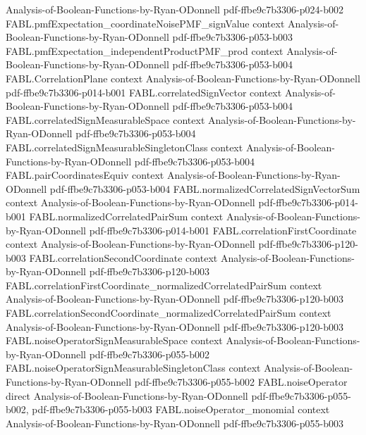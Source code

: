 \begin{theorem}
  {Analysis-of-Boolean-Functions-by-Ryan-ODonnell}
  {pdf-ffbe9c7b3306-p024-b002}
\proofstep
  {FABL.pmfExpectation_coordinateNoisePMF_signValue}
  {context}
  {Analysis-of-Boolean-Functions-by-Ryan-ODonnell}
  {pdf-ffbe9c7b3306-p053-b003}
\proofstep
  {FABL.pmfExpectation_independentProductPMF_prod}
  {context}
  {Analysis-of-Boolean-Functions-by-Ryan-ODonnell}
  {pdf-ffbe9c7b3306-p053-b004}
\proofstep
  {FABL.CorrelationPlane}
  {context}
  {Analysis-of-Boolean-Functions-by-Ryan-ODonnell}
  {pdf-ffbe9c7b3306-p014-b001}
\proofstep
  {FABL.correlatedSignVector}
  {context}
  {Analysis-of-Boolean-Functions-by-Ryan-ODonnell}
  {pdf-ffbe9c7b3306-p053-b004}
\proofstep
  {FABL.correlatedSignMeasurableSpace}
  {context}
  {Analysis-of-Boolean-Functions-by-Ryan-ODonnell}
  {pdf-ffbe9c7b3306-p053-b004}
\proofstep
  {FABL.correlatedSignMeasurableSingletonClass}
  {context}
  {Analysis-of-Boolean-Functions-by-Ryan-ODonnell}
  {pdf-ffbe9c7b3306-p053-b004}
\proofstep
  {FABL.pairCoordinatesEquiv}
  {context}
  {Analysis-of-Boolean-Functions-by-Ryan-ODonnell}
  {pdf-ffbe9c7b3306-p053-b004}
\proofstep
  {FABL.normalizedCorrelatedSignVectorSum}
  {context}
  {Analysis-of-Boolean-Functions-by-Ryan-ODonnell}
  {pdf-ffbe9c7b3306-p014-b001}
\proofstep
  {FABL.normalizedCorrelatedPairSum}
  {context}
  {Analysis-of-Boolean-Functions-by-Ryan-ODonnell}
  {pdf-ffbe9c7b3306-p014-b001}
\proofstep
  {FABL.correlationFirstCoordinate}
  {context}
  {Analysis-of-Boolean-Functions-by-Ryan-ODonnell}
  {pdf-ffbe9c7b3306-p120-b003}
\proofstep
  {FABL.correlationSecondCoordinate}
  {context}
  {Analysis-of-Boolean-Functions-by-Ryan-ODonnell}
  {pdf-ffbe9c7b3306-p120-b003}
\proofstep
  {FABL.correlationFirstCoordinate_normalizedCorrelatedPairSum}
  {context}
  {Analysis-of-Boolean-Functions-by-Ryan-ODonnell}
  {pdf-ffbe9c7b3306-p120-b003}
\proofstep
  {FABL.correlationSecondCoordinate_normalizedCorrelatedPairSum}
  {context}
  {Analysis-of-Boolean-Functions-by-Ryan-ODonnell}
  {pdf-ffbe9c7b3306-p120-b003}
\proofstep
  {FABL.noiseOperatorSignMeasurableSpace}
  {context}
  {Analysis-of-Boolean-Functions-by-Ryan-ODonnell}
  {pdf-ffbe9c7b3306-p055-b002}
\proofstep
  {FABL.noiseOperatorSignMeasurableSingletonClass}
  {context}
  {Analysis-of-Boolean-Functions-by-Ryan-ODonnell}
  {pdf-ffbe9c7b3306-p055-b002}
\proofstep
  {FABL.noiseOperator}
  {direct}
  {Analysis-of-Boolean-Functions-by-Ryan-ODonnell}
  {pdf-ffbe9c7b3306-p055-b002,
    pdf-ffbe9c7b3306-p055-b003}
\proofstep
  {FABL.noiseOperator_monomial}
  {context}
  {Analysis-of-Boolean-Functions-by-Ryan-ODonnell}
  {pdf-ffbe9c7b3306-p055-b003}

\end{theorem}

